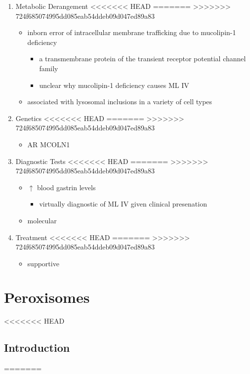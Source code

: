 \documentclass[fontsize=12pt]{scrartcl}
\begin{document}
\begin{enumerate}
\begin{enumerate}
\begin{enumerate}
\begin{enumerate}
\begin{table}[htbp]
\begin{enumerate}
\begin{enumerate}
\begin{enumerate}
\begin{enumerate}
\begin{enumerate}
\begin{enumerate}
\begin{enumerate}
\begin{enumerate}
\item Metabolic Derangement
<<<<<<< HEAD
\label{sec:orga8490d9}
=======
\label{sec:org3e6bfeb}
>>>>>>> 724f685074995dd085eab54ddeb09d047ed89a83
\begin{itemize}
\item inborn error of intracellular membrane trafficking due to mucolipin-1 deficiency
\begin{itemize}
\item a transmembrane protein of the transient receptor potential channel family
\item unclear why  mucolipin-1 deficiency causes ML IV
\end{itemize}
\item associated with lysosomal inclusions in a variety of cell types
\end{itemize}
\item Genetics
<<<<<<< HEAD
\label{sec:org6a0e3fa}
=======
\label{sec:org44db9c5}
>>>>>>> 724f685074995dd085eab54ddeb09d047ed89a83
\begin{itemize}
\item AR MCOLN1
\end{itemize}
\item Diagnostic Tests
<<<<<<< HEAD
\label{sec:org651c0a1}
=======
\label{sec:org4b30f27}
>>>>>>> 724f685074995dd085eab54ddeb09d047ed89a83
\begin{itemize}
\item \(\uparrow\) blood gastrin levels
\begin{itemize}
\item virtually diagnostic of ML IV given clinical presenation
\end{itemize}
\item molecular
\end{itemize}

\item Treatment
<<<<<<< HEAD
\label{sec:org9a3de78}
=======
\label{sec:org812f62c}
>>>>>>> 724f685074995dd085eab54ddeb09d047ed89a83
\begin{itemize}
\item supportive
\end{itemize}
\end{enumerate}

\section{Peroxisomes}
<<<<<<< HEAD
\label{sec:org77edeec}
\subsection{Introduction}
\label{sec:orgdef49e2}
=======
\label{sec:orga525872}

\end{enumerate}
\end{enumerate}
\end{enumerate}
\end{enumerate}
\end{enumerate}
\end{enumerate}
\end{enumerate}
\end{table}
\end{enumerate}
\end{enumerate}
\end{enumerate}
\end{enumerate}
\end{document}
